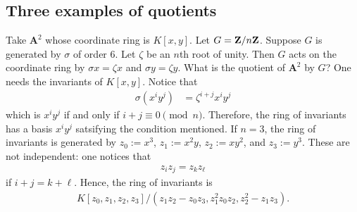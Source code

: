 \documentclass[11pt, oneside,margin=1in]{article}
\begin{document}
\subsection{Three examples of quotients}
\begin{example}\label{}\text{}
Take $\mathbf{A}^2$ whose coordinate ring is $K[x,y]$. Let $G=\mathbf Z / n\mathbf Z$. Suppose $G$ is generated by $\sigma$ of order $6$. Let $\zeta$ be an $n$th root of unity. Then $G$ acts on the coordinate ring by $\sigma x = \zeta x$ and $\sigma y = \zeta y$. What is the quotient of $\mathbf{A}^2$ by $G$? One needs the invariants of $K[x,y]$. Notice that 
\begin{align*}
	\sigma(x^iy^j) &= \zeta^{i+j} x^iy^j
\end{align*}
which is $x^iy^j$ if and only if $i+j\equiv 0\pmod n$. Therefore, the ring of invariants has a basis $x^iy^j$ satsifying the condition mentioned. If $n=3$, the ring of invariants is generated by $z_0:=x^3$, $z_1:=x^2y$, $z_2:=xy^2$, and $z_3:=y^3$. These are not independent: one notices that
\begin{align*}
	z_iz_j = z_kz_\ell
\end{align*}
if $i+j=k+\ell$. Hence, the ring of invariants is
\begin{align*}
	K[z_0,z_1,z_2,z_3] / (z_1z_2-z_0z_3, z_1^2 z_0z_2, z_2^2-z_1z_3). 
\end{align*}
\end{example}
\end{document}
